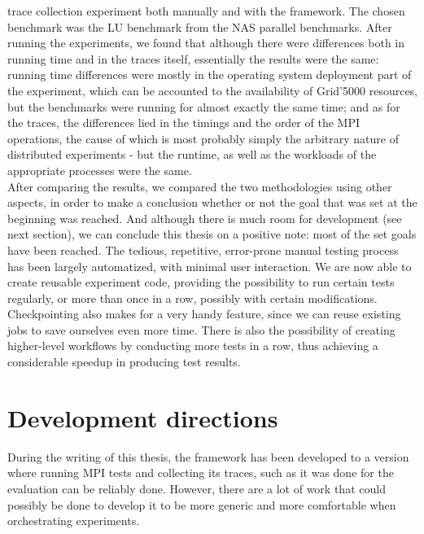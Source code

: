 trace collection experiment both manually and with the framework. The
chosen benchmark was the LU benchmark from the NAS parallel
benchmarks. After running the experiments, we found that although
there were differences both in running time and in the traces itself,
essentially the results were the same: running time differences were
mostly in the operating system deployment part of the experiment,
which can be accounted to the availability of Grid'5000 resources, but
the benchmarks were running for almost exactly the same time; and as
for the traces, the differences lied in the timings and the order of
the MPI operations, the cause of which is most probably simply the
arbitrary nature of distributed experiments - but the runtime, as well
as the workloads of the appropriate processes were the same.\\
After comparing the results, we compared the two methodologies using
other aspects, in order to make a conclusion whether or not the goal
that was set at the beginning was reached. And although there is much
room for development (see next section), we can conclude this thesis
on a positive note: most of the set goals have been reached. The
tedious, repetitive, error-prone manual testing process has been
largely automatized, with minimal user interaction. We are now able to
create reusable experiment code, providing the possibility to run
certain tests regularly, or more than once in a row, possibly with
certain modifications. Checkpointing also makes for a very handy
feature, since we can reuse existing jobs to save ourselves even more
time. There is also the possibility of creating higher-level
workflows by conducting more tests in a row, thus achieving a
considerable speedup in producing test results.

\section{Development directions}
During the writing of this thesis, the framework has been developed to
a version where running MPI tests and collecting its traces, such as
it was done for the evaluation can be reliably done. However, there
are a lot of work that could possibly be done to develop it to be
more generic and more comfortable when orchestrating experiments.
